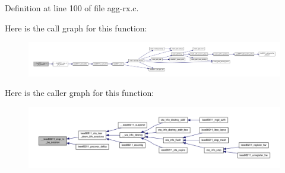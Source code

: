 Definition at line 100 of file agg-\/rx.\-c.



Here is the call graph for this function\-:
\nopagebreak
\begin{figure}[H]
\begin{center}
\leavevmode
\includegraphics[width=350pt]{agg-rx_8c_abe0eda6a21900d91f2c9f256374b8eed_cgraph}
\end{center}
\end{figure}




Here is the caller graph for this function\-:
\nopagebreak
\begin{figure}[H]
\begin{center}
\leavevmode
\includegraphics[width=350pt]{agg-rx_8c_abe0eda6a21900d91f2c9f256374b8eed_icgraph}
\end{center}
\end{figure}


